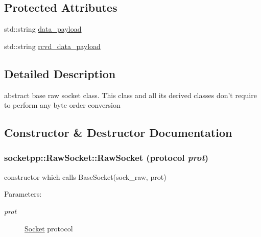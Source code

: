 \subsection*{Protected Attributes}
\begin{CompactItemize}
\item 
std::string \hyperlink{classsocketpp_1_1RawSocket_4d3a1236c4ac42ab029323ae14586ff8}{data\_\-payload}
\item 
std::string \hyperlink{classsocketpp_1_1RawSocket_3e166c1c401c30b5721dc54f93772b36}{rcvd\_\-data\_\-payload}
\end{CompactItemize}


\subsection{Detailed Description}
abstract base raw socket class. This class and all its derived classes don't require to perform any byte order conversion 

\subsection{Constructor \& Destructor Documentation}
\hypertarget{classsocketpp_1_1RawSocket_1a77e11388869bc70457efb75cd40b82}{
\subsubsection[{RawSocket}]{\setlength{\rightskip}{0pt plus 5cm}socketpp::RawSocket::RawSocket ({\bf protocol} {\em prot})}}
\label{classsocketpp_1_1RawSocket_1a77e11388869bc70457efb75cd40b82}


constructor which calls BaseSocket(sock\_\-raw, prot) 

\begin{Desc}
\item[Parameters:]
\begin{description}
\item[{\em prot}]\hyperlink{classsocketpp_1_1Socket}{Socket} protocol \end{description}
\end{Desc}


